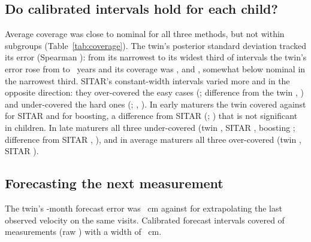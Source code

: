 \documentclass[journal]{IEEEtran}
\begin{document}
\subsection{Do calibrated intervals hold for each child?}
Average coverage was close to nominal for all three methods, but not within subgroups
(Table~\ref{tab:coverage}). The twin's posterior standard deviation tracked its error (Spearman
\AdaptRho{}): from its narrowest to its widest third of intervals the twin's error rose from
\ErrNarrow{} to \ErrWide{}~years and its coverage was \CovTwinNarrow{}, \CovTwinMiddle{} and
\CovTwinWide{}, somewhat below nominal in the narrowest third. SITAR's constant-width intervals
varied more and in the opposite direction: they over-covered the easy cases (\CovSitarNarrow{};
difference from the twin \CovNarrowDiffSitar{}, \CovNarrowDiffSitarCI{}) and under-covered the hard
ones (\CovSitarWide{}; \CovWideDiffSitar{}, \CovWideDiffSitarCI{}). In early maturers the twin
covered \CovTwinEarly{} against \CovSitarEarly{} for SITAR and \CovMlEarly{} for boosting, a
difference from SITAR (\CovEarlyDiffSitar{}; \CovEarlyDiffSitarCI{}) that is not significant in
\TwEarlyChildren{} children. In late
maturers all three under-covered (twin \CovTwinLate{}, SITAR \CovSitarLate{}, boosting
\CovMlLate{}; difference from SITAR \CovLateDiffSitar{}, \CovLateDiffSitarCI{}), and in average
maturers all three over-covered (twin \CovTwinAverage{}, SITAR \CovSitarAverage{}).

\begin{table}[!t]
\caption{Coverage of calibrated nominal \SpecInterval{} intervals within subgroups (real data,
held-out children). Width thirds are formed from the twin's interval within each sex and number of
visits; MAE and width in years.}
\label{tab:coverage}
\centering
\resizebox{\columnwidth}{!}{}
\end{table}

\subsection{Forecasting the next measurement}
The twin's \SpecHorizon{}-month forecast error was \TwForecastMAESame{}~cm against \TwNaiveMAE{} for
extrapolating the last observed velocity on the same visits. Calibrated forecast intervals covered
\TwForecastCovConf{} of measurements (raw \TwForecastCovRaw{}) with a width of
\TwForecastWidthConf{}~cm.
\end{document}
